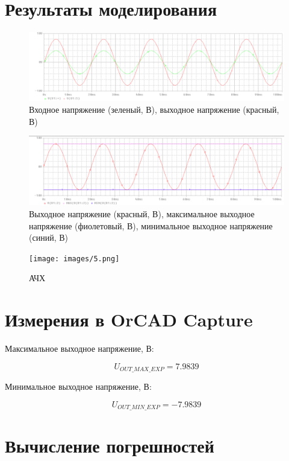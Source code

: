 \chapter{Результаты моделирования}

\begin{figure}[h!]
	\centering
	\caption{Входное напряжение (зеленый, В), выходное напряжение (красный, В) }
	\includegraphics{images/3.png}
\end{figure}

\begin{figure}[h!]
	\centering
	\caption{Выходное напряжение (красный, В), максимальное выходное напряжение (фиолетовый, В), минимальное выходное напряжение (синий, В)}
	\includegraphics{images/4.png}
\end{figure}

\begin{figure}[h!]
	\centering
	\caption{АЧХ}
	\texttt{[image: images/5.png]}
\end{figure}



\chapter{Измерения в OrCAD Capture}

Максимальное выходное напряжение, В:   				          

\[
 U_{OUT\_MAX\_EXP}=7.9839
 \]

Минимальное выходное напряжение, В:

\[
U_{OUT\_MIN\_EXP}=-7.9839
\]

\chapter{Вычисление погрешностей}

